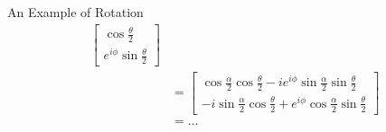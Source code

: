 \documentclass{beamer}
\begin{document}
\begin{frame}{An Example of Rotation\tiny\cite{rotationsonblochsphere}}
{\begin{align*}
                             \begin{bmatrix}
                               \cos{\frac{\theta}2} \\
                               e^{i\phi}\sin{\frac{\theta}2}
                             \end{bmatrix} \\
                             &= \begin{bmatrix}
                               \cos\frac{\alpha}2 \cos\frac{\theta}2 - i e^{i\phi} \sin\frac{\alpha}2 \sin\frac{\theta}2 \\
                               -i \sin\frac{\alpha}2 \cos\frac{\theta}2 + e^{i\phi} \cos\frac{\alpha}2 \sin\frac{\theta}2
                                \end{bmatrix} \\
                             &= \dots
  \end{align*}
  }%
\end{frame}
\end{document}

